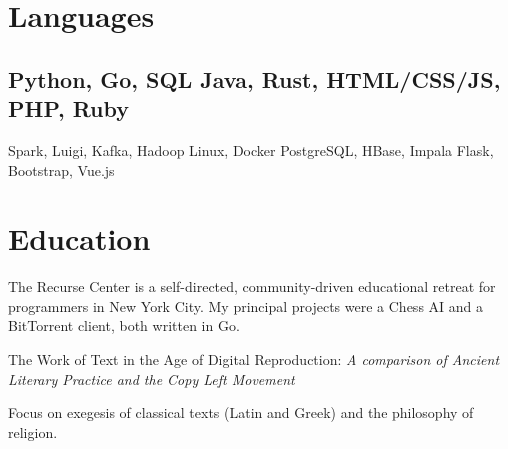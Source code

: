 \documentclass[]{deedy-resume-openfont}
\begin{document}
\section{Languages}
\vspace{\topsep} %
\subsection{Python, Go, SQL \textbullet{} Java, Rust, HTML/CSS/JS, PHP, Ruby}
\vspace{\topsep} %
Spark, Luigi, Kafka, Hadoop \textbullet{} Linux, Docker \textbullet{} PostgreSQL, HBase, Impala \textbullet{} Flask, Bootstrap, Vue.js
\sectionsep


\section{Education}
\vspace{\topsep} %
\vspace{\topsep} %
The Recurse Center is a self-directed, community-driven educational retreat for programmers in New York City.\newline
My principal projects were a Chess AI and a BitTorrent client, both written in Go.
\sectionsep


\vspace{\topsep} %
The Work of Text in the Age of Digital Reproduction:
\textit{A comparison of Ancient Literary Practice and the Copy Left Movement}
\sectionsep %

\vspace{\topsep} %
Focus on exegesis of classical texts (Latin and Greek) and the philosophy of religion.
\sectionsep
\end{document}
